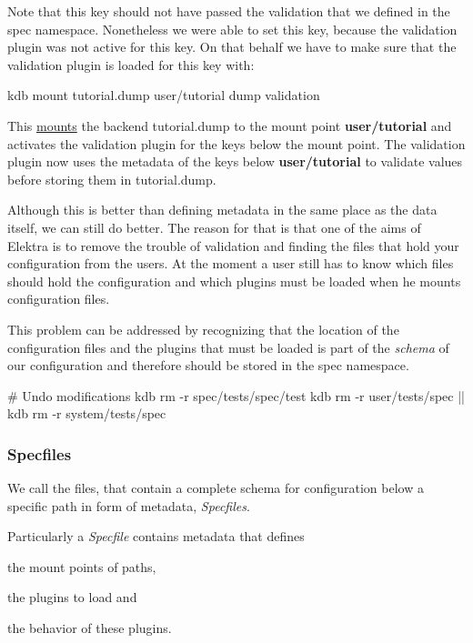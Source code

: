 Note that this key should not have passed the validation that we defined in the spec namespace. Nonetheless we were able to set this key, because the validation plugin was not active for this key. On that behalf we have to make sure that the validation plugin is loaded for this key with\+:


\begin{DoxyCode}
kdb mount tutorial.dump user/tutorial dump validation
\end{DoxyCode}


This \hyperlink{doc_tutorials_mount_md}{mounts} the backend {\ttfamily tutorial.\+dump} to the mount point {\bfseries user/tutorial} and activates the validation plugin for the keys below the mount point. The validation plugin now uses the metadata of the keys below {\bfseries user/tutorial} to validate values before storing them in {\ttfamily tutorial.\+dump}.

Although this is better than defining metadata in the same place as the data itself, we can still do better. The reason for that is that one of the aims of Elektra is to remove the trouble of validation and finding the files that hold your configuration from the users. At the moment a user still has to know which files should hold the configuration and which plugins must be loaded when he mounts configuration files.

This problem can be addressed by recognizing that the location of the configuration files and the plugins that must be loaded is part of the {\itshape schema} of our configuration and therefore should be stored in the spec namespace.


\begin{DoxyCode}
# Undo modifications
kdb rm -r spec/tests/spec/test
kdb rm -r user/tests/spec || kdb rm -r system/tests/spec
\end{DoxyCode}


\subsubsection*{Specfiles}

We call the files, that contain a complete schema for configuration below a specific path in form of metadata, {\itshape Specfiles}.

Particularly a {\itshape Specfile} contains metadata that defines


\begin{DoxyItemize}
\item the mount points of paths,
\item the plugins to load and
\item the behavior of these plugins.
\end{DoxyItemize}

